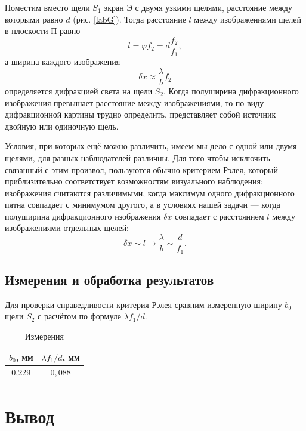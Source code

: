 \documentclass[a4paper,12pt]{article} %
\begin{document}
Поместим вместо щели $S_1$ экран Э с двумя узкими щелями, расстояние между которыми равно $d$ (рис. \ref{labG}). Тогда расстояние $l$ между изображениями щелей в плоскости П равно
\begin{equation}
l = \varphi f_2 = d \dfrac{f_2}{f_1},
\end{equation}
а ширина каждого изображения
\begin{equation}
\delta x \approx \dfrac{\lambda}{b} f_2
\end{equation}
определяется дифракцией света на щели $S_2$. Когда полуширина дифракционного изображения превышает расстояние между изображениями, то по виду дифракционной картины трудно определить, представляет собой источник двойную или одиночную щель.

Условия, при которых ещё можно различить, имеем мы дело с одной или двумя щелями, для разных наблюдателей различны. Для того чтобы исключить связанный с этим произвол, пользуются обычно критерием Рэлея, который приблизительно соответствует возможностям визуального наблюдения: изображения считаются различимыми, когда максимум одного дифракционного пятна совпадает с минимумом другого, а в условиях нашей задачи --- когда полуширина дифракционного изображения $\delta x$ совпадает с расстоянием $l$ между изображениями отдельных щелей:
\begin{equation}
\delta x \sim l \to \dfrac{\lambda}{b} \sim \dfrac{d}{f_1}.
\end{equation}

\subsection{Измерения и обработка результатов}

Для проверки справедливости критерия Рэлея сравним измеренную ширину $b_0$ щели $S_2$ с расчётом по формуле $\lambda f_1/d$.

\begin{table}[h!]
	\centering
	\caption{Измерения}
	\begin{tabular}{|c|c|} \hline
		$b_0$, мм &	$\lambda f_1/d$, мм \\
		\hline
		0,229 &	$0,088$ \\ \hline
	\end{tabular}   
\end{table}

\section*{Вывод}
\end{document}
